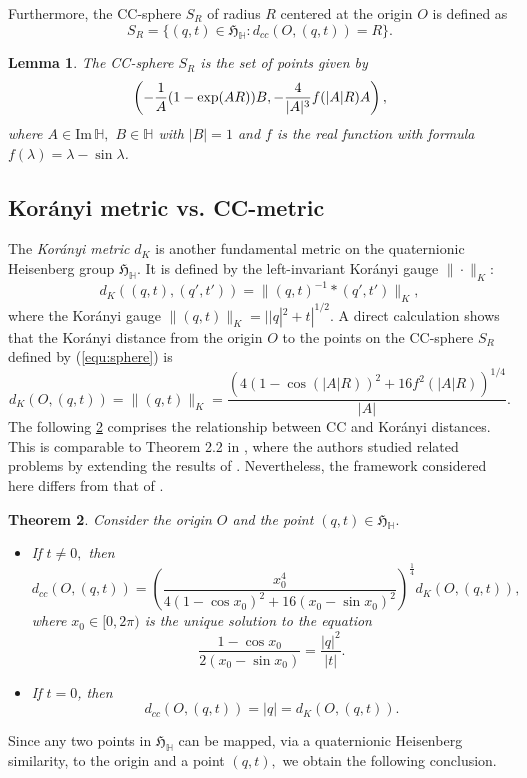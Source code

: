 \documentclass [12pt,a4paper]{amsart}
\renewcommand{\Im}{\textrm{Im}}
\newcommand{\mH}{\mathbb{H}}
\newcommand{\frakH}{\mathfrak{H}}
\theoremstyle{plain}
\newtheorem{thm}{Theorem}[section]
\newtheorem{lem}[thm]{Lemma}
\theoremstyle{definition}
\numberwithin{equation}{section}
\begin{document}
Furthermore, the CC-sphere $S_R$ of radius $R$ centered at the origin $O$ is defined as
$$S_R=\{(q, t)\in\frakH_\mH: d_{cc}(O, (q, t))=R\}.$$ 
\begin{lem}\label{lem:CC-sphere}
The CC-sphere $S_R$ is the set of points given by 
 \begin{equation}\label{equ:sphere}
 \left(-\frac{1}{A}(1-{\rm exp}(AR))B,  -\frac{4}{|A|^3}f(|A|R)A\right),
\end{equation}
where $A\in\Im\,\mH,$ $B\in\mH$ with $|B|=1$ and $f$ is the real  function with formula $f(\lambda)=\lambda-\sin\lambda$.
\end{lem}
\subsection{Kor\'anyi metric vs. CC-metric}\label{subsec:KC}
The {\it Kor\'{a}nyi metric} $d_K$ is another fundamental metric on the quaternionic Heisenberg group $\frakH_\mH.$ It is defined by the left-invariant Kor\'{a}nyi gauge $\|\cdot\|_K$: 
$$
d_K((q, t), (q', t'))= \|(q, t)^{-1}\ast(q', t')\|_K,
$$
where the Kor\'{a}nyi gauge  $\|(q, t)\|_K=||q|^2+t|^{1/2}.$ 
 A direct calculation shows that the Kor\'{a}nyi distance from the origin $O$ to the points on the CC-sphere $S_R$ defined by (\ref{equ:sphere}) is
\begin{equation*}
d_{K}(O, (q, t))=\|(q, t)\|_K=\frac{\left(4(1-\cos(|A|R))^2+16f^2(|A|R)\right)^{1/4}}{|A|}.
\end{equation*}
The following \ref{thm-comp} comprises the relationship between CC and Kor\'{a}nyi distances. This is comparable to Theorem 2.2 in \cite{KP}, where the authors studied related problems by extending the results of \cite{BM}. Nevertheless, the framework considered here differs from that of \cite{KP}.
\begin{thm}\label{thm-comp}
Consider the origin $O$ and the point $(q, t)\in\frakH_\mH.$ 
\begin{itemize}
\item[(i)] If $t\neq0,$ then 
\[
d_{cc}(O, (q, t))=\left(\frac{x_0^4}{4(1-\cos x_0)^2+16(x_0-\sin x_0)^2 } \right)^{\frac{1}{4}}d_{K}(O, (q, t)),
\]
where $x_0\in [0, 2\pi)$ is the unique solution to the equation 
\[
\frac{1-\cos x_0}{2(x_0-\sin x_0)}=\frac{|q|^2}{|t|}.
\]
    \item[(ii)] If $t = 0$, then 
    \[
    d_{cc}(O, (q, t)) = |q| = d_{K}(O, (q, t)).
    \]
\end{itemize} 
\end{thm}
Since any two points in $\frakH_\mH$ can be mapped, via a quaternionic Heisenberg similarity, to the origin and a point $(q, t),$ we obtain the following conclusion.
\end{document}
